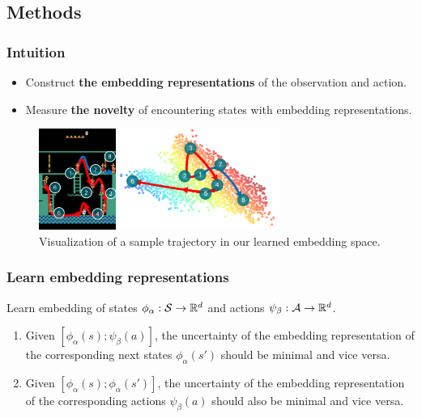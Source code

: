 \documentclass[10pt,mathserif]{beamer}
\begin{document}

\subsection{Methods} %


\begin{frame}
\frametitle{Intuition}
  \begin{itemize} \itemsep=6pt
      \item Construct \textbf{the embedding representations} of the observation and action.
      \item Measure \textbf{the novelty} of encountering states with embedding representations.
  \end{itemize}
  \pause

  \begin{figure}[h]
        \centering
          \includegraphics[width=0.7\textwidth]{emi_figures/figure_embedding_concept}
          \caption{Visualization of a sample trajectory in our learned embedding space.}
  \end{figure}

\end{frame}



\begin{frame}
\frametitle{Learn embedding representations}

Learn embedding of states $\phi_\alpha : \mathcal{S} \rightarrow \mathbb R^d$ and actions $\psi_\beta: \mathcal{A} \rightarrow \mathbb R^d$.
\vspace{1em}

\begin{enumerate} \itemsep=12pt
\item Given $[\phi_\alpha(s); \psi_\beta(a)]$, the uncertainty of the embedding representation of the corresponding next states $\phi_\alpha(s')$ should be minimal and vice versa. \pause

\item Given $[\phi_\alpha(s); \phi_\alpha(s')]$, the uncertainty of the embedding representation of the corresponding actions $\psi_\beta(a)$ should also be minimal and vice versa.

\end{enumerate}
\end{frame}
\end{document}
